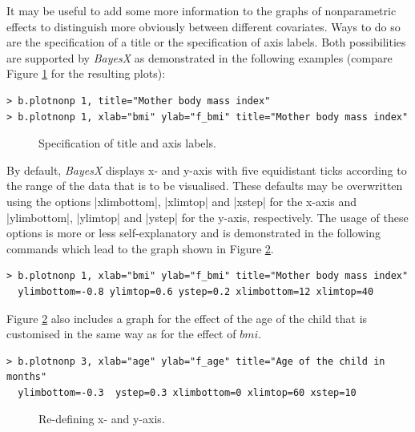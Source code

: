 It may be useful to add some more information to the graphs of nonparametric effects to distinguish more obviously between
different covariates. Ways to do so are the specification of a title or the specification of axis labels. Both possibilities
are supported by {\it BayesX} as demonstrated in the following examples (compare Figure \ref{mcmc:bmi4} for the resulting
plots):

\begin{verbatim}
> b.plotnonp 1, title="Mother body mass index"
> b.plotnonp 1, xlab="bmi" ylab="f_bmi" title="Mother body mass index"
\end{verbatim}

\begin{figure}[ht]
\begin{center}
\begin{multicols}{2}
\end{multicols}
{\it\caption{Specification of title and axis labels.\label{mcmc:bmi4}}}
\end{center}
\end{figure}

By default, {\it BayesX} displays x- and y-axis with five equidistant ticks according to the range of the data that is to be
visualised. These defaults may be overwritten using the options |xlimbottom|, |xlimtop| and |xstep| for the x-axis and
|ylimbottom|, |ylimtop| and |ystep| for the y-axis, respectively. The usage of these options is more or less self-explanatory
and is demonstrated in the following commands which lead to the graph shown in Figure \ref{mcmc:bmi6}.

\begin{verbatim}
> b.plotnonp 1, xlab="bmi" ylab="f_bmi" title="Mother body mass index"
  ylimbottom=-0.8 ylimtop=0.6 ystep=0.2 xlimbottom=12 xlimtop=40
\end{verbatim}

Figure \ref{mcmc:bmi6} also includes a graph for the effect of the age of the child that is customised in the same way as for
the effect of $\mathit{bmi}$.

\begin{verbatim}
> b.plotnonp 3, xlab="age" ylab="f_age" title="Age of the child in months"
  ylimbottom=-0.3  ystep=0.3 xlimbottom=0 xlimtop=60 xstep=10
\end{verbatim}

\begin{figure}[ht]
\begin{center}
{\it\caption{Re-defining x- and y-axis.\label{mcmc:bmi6}}}
\end{center}
\end{figure}

